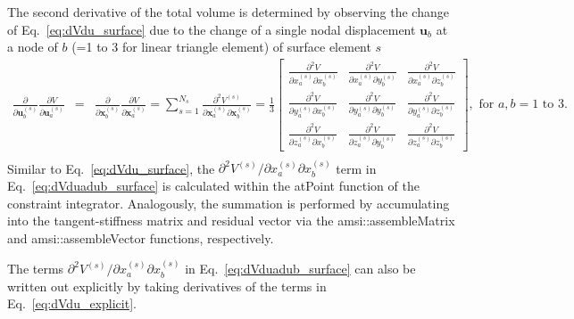 The second derivative of the total volume is determined by observing the change of Eq.\ \eqref{eq:dVdu_surface} due to the change of a single nodal displacement $\pmb{u}_b$ at a node of $b$ (=1 to 3 for linear triangle element) of surface element $s$
%
\begin{eqnarray}
\frac{\partial}{\partial \pmb{u}_b^{(s)}}\frac{\partial V}{\partial \pmb{u}_a^{(s)}} &=& \frac{\partial}{\partial \pmb{x}_b^{(s)}}\frac{\partial V}{\partial \pmb{x}_a^{(s)}} 
%
=\sum_{s=1}^{N_{s}}\frac{\partial^2 V^{(s)}}{\partial \pmb{x}_a^{(s)} \partial \pmb{x}_b^{(s)}} = 
%
\frac{1}{3}\begin{bmatrix}
\frac{\partial^2 V}{\partial x_a^{(s)} \partial x_b^{(s)}} & \frac{\partial^2 V}{\partial x_a^{(s)} \partial y_b^{(s)}} & \frac{\partial^2 V}{\partial x_a^{(s)} \partial z_b^{(s)}} \\
%
\frac{\partial^2 V}{\partial y_a^{(s)} \partial x_b^{(s)}} & \frac{\partial^2 V}{\partial y_a^{(s)} \partial y_b^{(s)}} & \frac{\partial^2 V}{\partial y_a^{(s)} \partial z_b^{(s)}} \\
%
\frac{\partial^2 V}{\partial z_a^{(s)} \partial x_b^{(s)}} & \frac{\partial^2 V}{\partial z_a^{(s)} \partial y_b^{(s)}} & \frac{\partial^2 V}{\partial z_a^{(s)} \partial z_b^{(s)}} 
\end{bmatrix}, \text{ for } a,b = 1 \text{ to } 3. \nonumber\\
\label{eq:dVduadub_surface}
\end{eqnarray}
%
Similar to Eq.\ \eqref{eq:dVdu_surface}, the $\partial ^2 V^{(s)}/\partial x_a^{(s)}\partial x_b^{(s)}$ term in Eq.\ \eqref{eq:dVduadub_surface} is calculated within the atPoint function of the constraint integrator. Analogously, the summation is performed by accumulating into the tangent-stiffness matrix and residual vector via the amsi::assembleMatrix and amsi::assembleVector functions, respectively.

The terms $\partial ^2 V^{(s)}/\partial x_a^{(s)}\partial x_b^{(s)}$ in Eq.\ \eqref{eq:dVduadub_surface} can also be written out explicitly by taking derivatives of the terms in Eq.\ \eqref{eq:dVdu_explicit}. 

